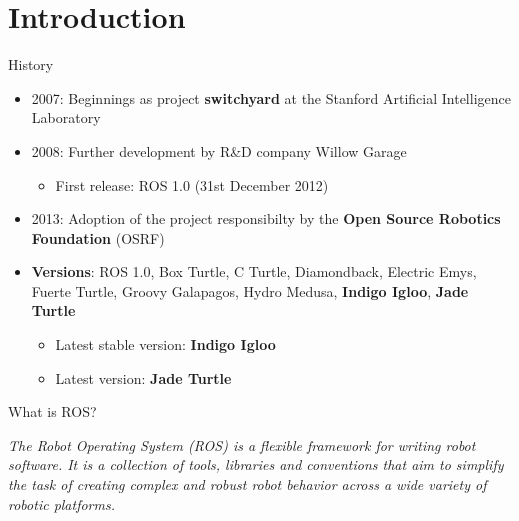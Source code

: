 \documentclass{beamer}
\begin{document}
\section{Introduction}
\begin{frame}{History}
\begin{itemize}
 \item 2007: Beginnings as project \textbf{switchyard} at the Stanford Artificial Intelligence Laboratory
 \item 2008: Further development by R\&D company Willow Garage  \href{https://www.willowgarage.com/pages/pr2/overview}{}
 \begin{itemize}
  \item First release: ROS 1.0 (31st December 2012)
 \end{itemize}
 \item 2013: Adoption of the project responsibilty by the \textbf{Open Source Robotics Foundation} (OSRF)
\end{itemize}

\begin{itemize}
 \item \textbf{Versions}: ROS 1.0, Box Turtle, C Turtle, Diamondback, Electric Emys, Fuerte Turtle, Groovy Galapagos, Hydro Medusa, \textbf{Indigo Igloo}, \textbf{Jade Turtle}
 \begin{itemize}
  \item Latest stable version: \textbf{Indigo Igloo}
  \item Latest version: \textbf{Jade Turtle}
 \end{itemize}
\end{itemize}
\end{frame}
\begin{frame}{What is ROS?}
\begin{definition}[ROS]
\textit{The Robot Operating System (ROS) is a flexible framework for writing robot software. It is a collection of tools, libraries and conventions that aim to simplify the task of creating complex and robust robot behavior across a wide variety of robotic platforms.}
\end{definition}
\end{frame}
\end{document}
